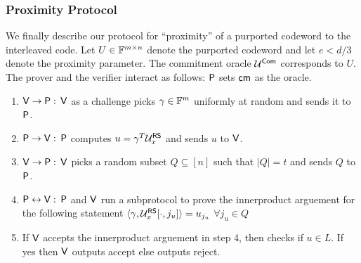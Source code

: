\subsubsection{Proximity Protocol}\label{subsec:proximity2D}
We finally describe our protocol for ``proximity'' of a purported codeword to the interleaved code. Let $U\in \mathbb{F}^{m\times n}$ denote the purported codeword and let $e< d/3$ denote the proximity parameter. The commitment oracle $\mathcal{U}^{\mathsf{Com}}$ corresponds to $U$.
The prover and the verifier interact as follows:
	$\mathsf{P}$ sets $\mathsf{cm}$ as the oracle.
\begin{enumerate}
	\item $\mathsf{V} \rightarrow \mathsf{P} :$ $\mathsf{V}$ as a challenge picks $\gamma \in \mathbb{F}^m$ uniformly at random and sends it to $\mathsf{P}$.
	
	\item $\mathsf{P} \rightarrow \mathsf{V} :$ $\mathsf{P}$ computes $u=\gamma^T\mathcal{U}^{\mathsf{RS}}_x$ and sends $u$ to $\mathsf{V}$.
	
	\item $\mathsf{V} \rightarrow \mathsf{P} :$ $\mathsf{V}$ picks a random subset $Q\subseteq [n]$ such that $|Q|=t$ and sends $Q$ to $\mathsf{P}$.
	
	\item $\mathsf{P} \leftrightarrow \mathsf{V}: $ $\mathsf{P}$ and $\mathsf{V}$ run a subprotocol to prove the innerproduct arguement for the following statement $\langle \gamma,\mathcal{U}^{\mathsf{RS}}_x[\cdot,j_u]\rangle=u_{j_u}$ $\forall j_u\in Q$
	
	\item If $\mathsf{V}$ accepts the innerproduct arguement in step 4, then checks if $u\in L$. If yes then $\mathsf{V}$ outputs accept else outputs reject.
\end{enumerate}

